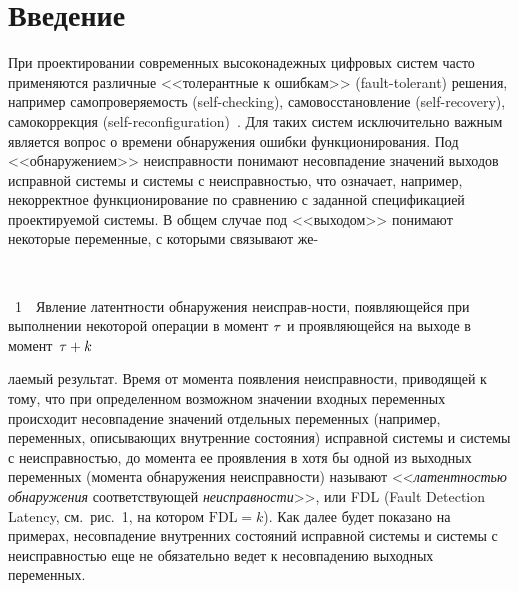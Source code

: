  \begin{multicols}{2}

 \label{st\stat}

\section{Введение}

 При проектировании современных высоконадежных цифровых систем часто
применяются различные <<толерантные к ошибкам>> (fault-tolerant) решения,
например самопроверяемость (self-checking), самовосстановление
(self-recovery), самокоррекция (self-reconfiguration)~\cite{1}.
Для таких систем исключительно важным является вопрос о времени обнаружения
ошибки функционирования.
Под <<обнаружением>> неисправности понимают
несовпадение значений выходов исправной системы и системы с неисправностью,
что означает, например, некорректное функционирование по сравнению с
заданной спецификацией проектируемой системы.
В общем случае под <<выходом>> понимают некоторые переменные, с которыми
связывают же-\linebreak
\begin{center} %
\vspace*{12pt}
\mbox{%
\epsfxsize=80mm %
}
\end{center}
{{\figurename~1}\ \ \small{Явление латентности обнаружения неисправ-\linebreak ности, появляющейся при
выполнении некоторой операции в момент $\tau$ и проявляющейся на выходе в
момент~$\tau + k$}}

\medskip
\addtocounter{figure}{1}



\noindent
лаемый результат.
Время от момента появления неисправности, приводящей к тому, что при
определенном возможном значении входных переменных происходит несовпадение
значений отдельных переменных (например, переменных, опи\-сы\-ва\-ющих
внутренние состояния) исправной сис\-те\-мы и сис\-те\-мы
с неисправностью, до момента ее проявления в хотя бы одной из выходных
переменных (момента обнаружения неисправности) называют <<{\it латентностью
обнаружения} соответствующей {\it не\-ис\-прав\-ности}>>, или FDL
(Fault Detection Latency, см.\ рис.~1, на котором $\mathrm{FDL} = k$).
Как далее будет показано
на примерах, несовпадение внутренних
состояний исправной сис\-те\-мы и сис\-те\-мы с неисправностью еще не обязательно
ведет к несовпадению выходных переменных.



\end{multicols}
